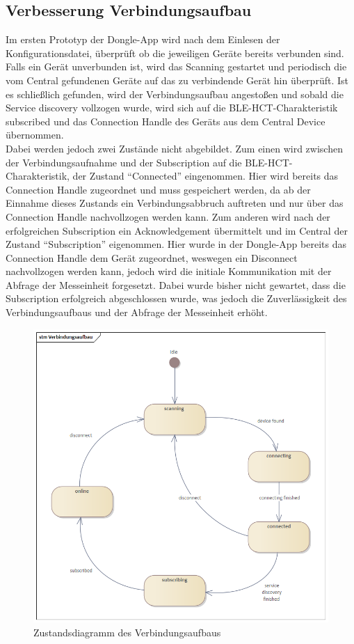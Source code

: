 \subsection{Verbesserung Verbindungsaufbau}
Im ersten Prototyp der Dongle-App wird nach dem Einlesen der Konfigurationsdatei, überprüft ob die jeweiligen Geräte bereits verbunden sind. Falls ein Gerät unverbunden ist, wird das Scanning gestartet und periodisch die vom Central gefundenen Geräte auf das zu verbindende Gerät hin überprüft. Ist es schließlich gefunden, wird der Verbindungsaufbau angestoßen und sobald die Service discovery vollzogen wurde, wird sich auf die BLE-HCT-Charakteristik subscribed und das Connection Handle des Geräts aus dem Central Device übernommen. \\
Dabei werden jedoch zwei Zustände nicht abgebildet. Zum einen wird zwischen der Verbindungsaufnahme und der Subscription auf die BLE-HCT-Charakteristik, der Zustand ``Connected'' eingenommen. Hier wird bereits das Connection Handle zugeordnet und muss gespeichert werden, da ab der Einnahme dieses Zustands ein Verbindungsabbruch auftreten und nur über das Connection Handle nachvollzogen werden kann. Zum anderen wird nach der erfolgreichen Subscription ein Acknowledgement übermittelt und im Central der Zustand ``Subscription'' eigenommen. Hier wurde in der Dongle-App bereits das Connection Handle dem Gerät zugeordnet, weswegen ein Disconnect nachvollzogen werden kann, jedoch wird die initiale Kommunikation mit der Abfrage der Messeinheit forgesetzt. Dabei wurde bisher nicht gewartet, dass die Subscription erfolgreich abgeschlossen wurde, was jedoch die Zuverlässigkeit des Verbindungsaufbaus und der Abfrage der Messeinheit erhöht.

\begin{figure}[H] 
	\centering
	\includegraphics[width=\textwidth]{figures/Verbindungsaufbau.png}
	\caption{Zustandsdiagramm des Verbindungsaufbaus}
\end{figure}



